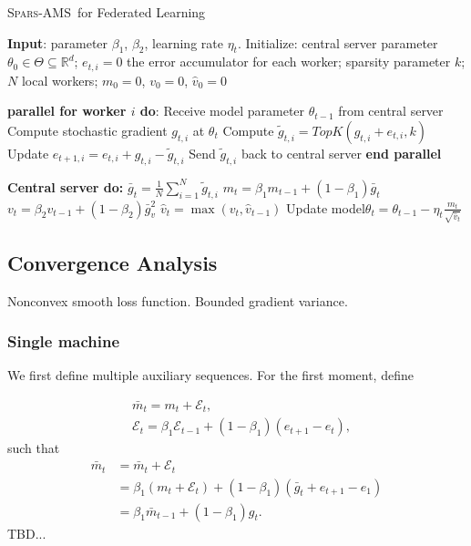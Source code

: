 \documentclass{article}
\newcommand{\algo}{\textsc{Spars-AMS}}
\begin{document}
\begin{algorithm}[H]
\caption{\algo\ for Federated Learning} \label{alg:sparsams}
\begin{algorithmic}[1]

\STATE \textbf{Input}: parameter $\beta_1$, $\beta_2$, learning rate $\eta_t$. 
\STATE Initialize: central server parameter $\theta_{0} \in \Theta \subseteq \mathbb R^d$; $e_{t,i}=0$ the error accumulator for each worker; sparsity parameter $k$; $N$ local workers; $m_0=0$, $v_0=0$, $\hat v_0=0$


\STATE\textbf{parallel for worker $i$ do}:
\STATE\quad Receive model parameter $\theta_{t-1}$ from central server
\STATE\quad  Compute stochastic gradient $g_{t,i}$ at $\theta_t$
\STATE\quad  Compute $\tilde g_{t,i}=TopK(g_{t,i}+e_{t,i},k)$
\STATE\quad  Update $e_{t+1,i}=e_{t,i}+g_{t,i}-\tilde g_{t,i}$
\STATE\quad  Send $\tilde g_{t,i}$ back to central server
\STATE \textbf{end parallel}

\STATE \textbf{Central server do:}
\STATE $\bar g_{t}=\frac{1}{N}\sum_{i=1}^N \tilde g_{t,i}$
\STATE $m_t=\beta_1 m_{t-1}+(1-\beta_1)\bar g_t$
\STATE $v_t=\beta_2 v_{t-1}+(1-\beta_2)\bar g_v^2$
\STATE $\hat v_t=\max(v_t,\hat v_{t-1})$
\STATE Update model$\theta_t=\theta_{t-1}-\eta_t\frac{m_t}{\sqrt{\hat v_t}}$

\ENDFOR
\end{algorithmic}
\end{algorithm}


\subsection{Convergence Analysis}
Nonconvex smooth loss function. Bounded gradient variance.

\subsubsection{Single machine}
We first define multiple auxiliary sequences. For the first moment, define

\begin{align*}
    &\bar m_t=m_t+\mathcal E_t,\\
    &\mathcal E_t=\beta_1\mathcal E_{t-1}+(1-\beta_1)(e_{t+1}-e_t),
\end{align*}
such that 
\begin{align*} 
    \bar m_t&=\bar m_t+\mathcal E_t\\
    &=\beta_1(m_t+\mathcal E_t)+(1-\beta_1)(\bar g_t+e_{t+1}-e_1)\\
    &=\beta_1\bar m_{t-1}+(1-\beta_1)g_t.
\end{align*}
TBD...
\end{document}
